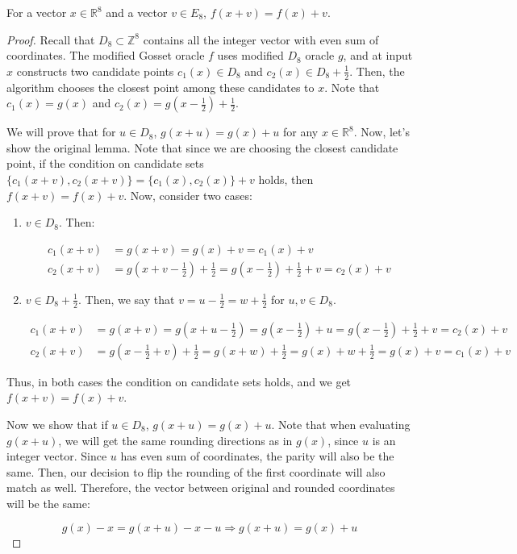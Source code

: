 \documentclass[10pt,a4paper]{amsart}
\begin{document}
\begin{lemma}
    For a vector $x \in \mathbb{R}^8$ and a vector $v \in E_8$, $f(x + v) = f(x) + v$.
    \label{lemma:nestquantm}
\end{lemma}

\begin{proof}
    Recall that $D_8 \subset \mathbb{Z}^8$ contains all the integer vector with even sum of coordinates. The modified Gosset oracle $f$ uses modified $D_8$ oracle $g$, and at input $x$ constructs two candidate points $c_1(x) \in D_8$ and $c_2(x) \in D_8 + \frac{1}{2}$. Then, the algorithm chooses the closest point among these candidates to $x$. Note that $c_1(x) = g(x)$ and $c_2(x) = g\left(x - \frac{1}{2}\right) + \frac{1}{2}$.

    We will prove that for $u \in D_8$, $g(x + u) = g(x) + u$ for any $x \in \mathbb{R}^8$. Now, let's show the original lemma. Note that since we are choosing the closest candidate point, if the condition on candidate sets $\{c_1(x + v), c_2(x + v)\} = \{c_1(x), c_2(x)\} + v$ holds, then $f(x+v) = f(x) + v$. Now, consider two cases:

    \begin{enumerate}
        \item $v \in D_8$. Then:

        \begin{align*}
            c_1(x + v) &= g(x + v) = g(x) + v = c_1(x) + v \\
            c_2(x + v) &= g\left(x+v-\frac{1}{2}\right) + \frac{1}{2} =
            g\left(x-\frac{1}{2}\right)+\frac{1}{2}+v =
            c_2(x) + v
        \end{align*}

        \item $v \in D_8+\frac{1}{2}$. Then, we say that $v = u - \frac{1}{2} = w + \frac{1}{2}$ for $u, v \in D_8$.

        \begin{align*}
            c_1(x + v) &= g(x + v) = g\left(x + u - \frac{1}{2}\right) = g\left(x - \frac{1}{2}\right) + u
            = g\left(x - \frac{1}{2}\right) + \frac{1}{2} + v =
            c_2(x) + v \\
            c_2(x + v) &= g\left(x - \frac{1}{2} + v\right) + \frac{1}{2} = g(x + w) + \frac{1}{2} = g(x) + w + \frac{1}{2} = g(x) + v = c_1(x) + v
        \end{align*}
    \end{enumerate}

    Thus, in both cases the condition on candidate sets holds, and we get $f(x + v) = f(x) + v$.

    Now we show that if $u \in D_8$, $g(x + u) = g(x) + u$. Note that when evaluating $g(x + u)$, we will get the same rounding directions as in $g(x)$, since $u$ is an integer vector. Since $u$ has even sum of coordinates, the parity will also be the same. Then, our decision to flip the rounding of the first coordinate will also match as well. Therefore, the vector between original and rounded coordinates will be the same:

    \[
        g(x) - x = g(x + u) - x - u \Rightarrow g(x + u) = g(x) + u
    \]
\end{proof}
\end{document}
